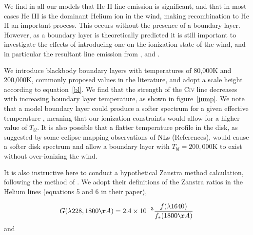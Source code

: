 \documentclass[preprint, a4paper, 11pt]{aastex}
\begin{document}



We find in all our models that He II line emission is significant, and that 
in most cases He  III is the dominant Helium ion in the wind, making recombination
to He II an important process. This occurs without the presence of a boundary 
layer. However, as a boundary layer is theoretically predicted 
it is still important to investigate the effects of introducing
one on the ionization state of the wind, and in particular
the resultant line emission from \heiiuv, \heiiuv and \civ. 

We introduce blackbody boundary layers with temperatures of 80,000K and 200,000K,
commonly proposed values in the literature, and adopt a scale height according to
equation~\ref{bl}. We find that the strength of the C\textsc{iv} line decreases
with increasing boundary layer temperature, as shown in figure~\ref{jump}.
We note that a model boundary layer could produce a softer
spectrum for a given effective temperature \citep[e.g.][]{suleimanov2014}, 
meaning that our ionization constraints would
allow for a higher value of $T_{bl}$. It is also
possible that a flatter temperature profile in the disk,
as suggested by some eclipse mapping observations of NLs (References),
would cause a softer disk spectrum and allow a boundary layer 
with $T_{bl} = 200,000$K to exist without over-ionizing the wind.


It is also instructive here to conduct a hypothetical 
Zanstra method calculation, following the method of \cite{hoare1991}. 
We adopt their definitions of the Zanstra ratios in the Helium lines (equations 5 and 6 
in their paper),


\begin{equation}
G (\lambda228, 1800 \AA) = 2.4\times 10^{-3} \frac{f(\lambda1640)}{f_*(1800\AA)}
\end{equation}
and
\end{document}
